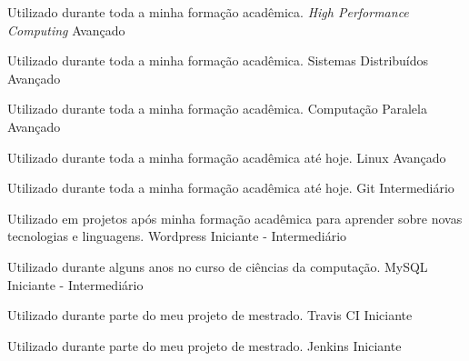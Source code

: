 \begin{cventries}

  \cventry
  {Utilizado durante toda a minha formação acadêmica.}
  {\textit{High Performance Computing}}
  {Avançado}
  {}
  {}

  \cventry
  {Utilizado durante toda a minha formação acadêmica.}
  {Sistemas Distribuídos}
  {Avançado}
  {}
  {}

  \cventry
  {Utilizado durante toda a minha formação acadêmica.}
  {Computação Paralela}
  {Avançado}
  {}
  {}

  \cventry
  {Utilizado durante toda a minha formação acadêmica até hoje.}
  {Linux}
  {Avançado}
  {}
  {}

  \cventry
  {Utilizado durante toda a minha formação acadêmica até hoje.}
  {Git}
  {Intermediário}
  {}
  {}

  \cventry
  {Utilizado em projetos após minha formação acadêmica para aprender sobre
  novas tecnologias e linguagens.}
  {Wordpress} %
  {Iniciante - Intermediário} %
  {}
  {}

  \cventry
  {Utilizado durante alguns anos no curso de ciências da computação.}
  {MySQL} %
  {Iniciante - Intermediário} %
  {}
  {}

  \cventry
  {Utilizado durante parte do meu projeto de mestrado.}
  {Travis CI} %
  {Iniciante} %
  {}
  {}

  \cventry
  {Utilizado durante parte do meu projeto de mestrado.}
  {Jenkins} %
  {Iniciante} %
  {}
  {}

\end{cventries}
